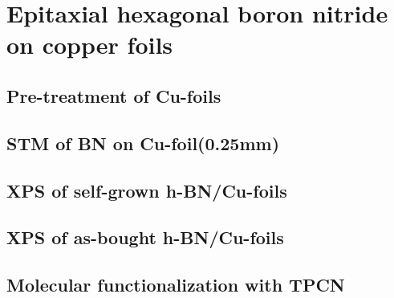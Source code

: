 \documentclass[10pt,a4paper,twoside
,BCOR=8mm				%
,headings=normal		%
,headsepline			%
,footsepline			%
,plainfootsepline		%
]{scrbook}
\begin{document}
\chapter{Epitaxial hexagonal boron nitride on copper foils}
  
\section{Pre-treatment of Cu-foils}
%      
%      
  \section{STM of BN on Cu-foil(0.25mm)}
     
  \section{XPS of self-grown h-BN/Cu-foils}
     
  \section{XPS of as-bought h-BN/Cu-foils}
     
  \section{Molecular functionalization with TPCN}
     
%    
%    
\end{document}

